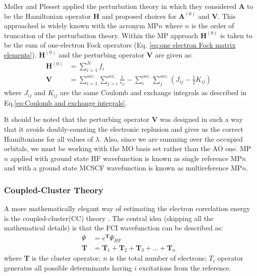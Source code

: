                 M\o{}ller and Plesset \cite{Moller1934} applied the perturbation theory in which they considered $\mathbf{A}$ to be the Hamiltonian operator $\mathbf{H}$ and proposed choices for $\mathbf{A}^{(0)}$ and $\mathbf{V}$. This approached is widely known with the acronym MP$n$ where $n$ is the order of truncation of the perturbation theory. Within the MP approach $\mathbf{H}^{(0)}$ is taken to be the sum of one-electron Fock operators (Eq. \eqref{eq:one electron Fock matrix elements}). $\mathbf{H}^{(0)}$ and the perturbing operator $\mathbf{V}$ are given as:
                \begin{equation}\label{eq:MP elements}
                    \begin{aligned}
                        \mathbf{H}^{(0)} &= \displaystyle\sum_{i=1}^N f_i\\
                        \mathbf{V} &= \displaystyle\sum_{i=1}^{occ.} \displaystyle\sum_{j > i}^{occ.} \frac{1}{r_{ij}} - \displaystyle\sum_{i}^{occ.} \displaystyle\sum_{j}^{occ.} \left (J_{ij} - \frac{1}{2} K_{ij} \right)
                    \end{aligned}
                \end{equation}
                where $J_{ij}$ and $K_{ij}$ are the same Coulomb and exchange integrals as described in Eq.\eqref{eq:Coulomb and exchange integrals}.

                It should be noted that the perturbing operator $\mathbf{V}$ was designed in such a way that it avoids doubly-counting the electronic replusion and gives us the correct Hamiltonians for all values of $\lambda$. Also, since we are summing over the occupied orbitals, we must be working with the MO basis set rather than the AO one. MP$n$ applied with ground state HF wavefunction is known as single reference MP$n$ and with a ground state MCSCF wavefunction is known as multireference MP$n$.

            \subsubsection{Coupled-Cluster Theory}\label{subsubsec:coupled-cluster theory}
                A more mathematically elegant way of estimating the electron correlation energy is the coupled-cluster(CC) theory \cite{Cizek1966}. The central idea (skipping all the mathematical details) is that the FCI wavefunction can be described as:
                \begin{equation}\label{eq:cc}
                    \begin{aligned}
                        \Psi &= e^\mathbf{T} \Psi_{HF}\\
                        \mathbf{T} &= \mathbf{T}_1 + \mathbf{T}_2 + \mathbf{T}_3 + \ldots + \mathbf{T}_n
                    \end{aligned}
                \end{equation}
                where $\mathbf{T}$ is the cluster operator; $n$ is the total number of electrons; $T_i$ operator generates all possible determinants having $i$ excitations from the reference.

